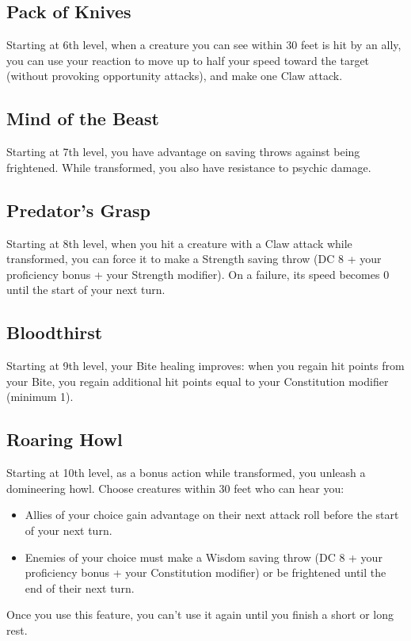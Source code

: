 \documentclass{apotheosis-book}
\begin{document}
\subsection*{Pack of Knives}
Starting at 6th level, when a creature you can see within 30 feet is hit by an ally, you can use your reaction to move up to half your speed toward the target (without provoking opportunity attacks), and make one Claw attack.

\subsection*{Mind of the Beast}
Starting at 7th level, you have advantage on saving throws against being frightened. While transformed, you also have resistance to psychic damage.

\subsection*{Predator's Grasp}
Starting at 8th level, when you hit a creature with a Claw attack while transformed, you can force it to make a Strength saving throw (DC 8 + your proficiency bonus + your Strength modifier). On a failure, its speed becomes 0 until the start of your next turn.

\subsection*{Bloodthirst}
Starting at 9th level, your Bite healing improves: when you regain hit points from your Bite, you regain additional hit points equal to your Constitution modifier (minimum 1).

\subsection*{Roaring Howl}
Starting at 10th level, as a bonus action while transformed, you unleash a domineering howl. Choose creatures within 30 feet who can hear you:
\begin{itemize}
\item Allies of your choice gain advantage on their next attack roll before the start of your next turn.
\item Enemies of your choice must make a Wisdom saving throw (DC 8 + your proficiency bonus + your Constitution modifier) or be frightened until the end of their next turn.
\end{itemize}
Once you use this feature, you can't use it again until you finish a short or long rest.
\end{document}
